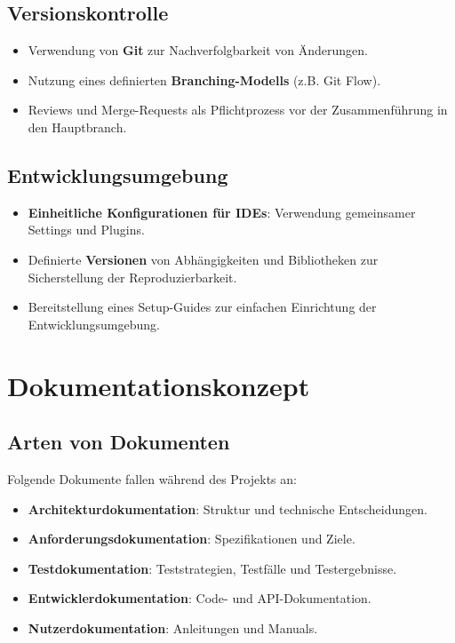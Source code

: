\documentclass[a4paper,12pt]{article}
\begin{document}
\subsection{Versionskontrolle}
\begin{itemize}
    \item Verwendung von \textbf{Git} zur Nachverfolgbarkeit von Änderungen.
    \item Nutzung eines definierten \textbf{Branching-Modells} (z.B. Git Flow).
    \item Reviews und Merge-Requests als Pflichtprozess vor der Zusammenführung in den Hauptbranch.
\end{itemize}

\subsection{Entwicklungsumgebung}
\begin{itemize}
    \item \textbf{Einheitliche Konfigurationen f\"ur IDEs}: Verwendung gemeinsamer Settings und Plugins.
    \item Definierte \textbf{Versionen} von Abhängigkeiten und Bibliotheken zur Sicherstellung der Reproduzierbarkeit.
    \item Bereitstellung eines Setup-Guides zur einfachen Einrichtung der Entwicklungsumgebung.
\end{itemize}
\newpage

\section{Dokumentationskonzept}
\subsection{Arten von Dokumenten}
Folgende Dokumente fallen w\"ahrend des Projekts an:
\begin{itemize}
    \item \textbf{Architekturdokumentation}: Struktur und technische Entscheidungen.
    \item \textbf{Anforderungsdokumentation}: Spezifikationen und Ziele.
    \item \textbf{Testdokumentation}: Teststrategien, Testfälle und Testergebnisse.
    \item \textbf{Entwicklerdokumentation}: Code- und API-Dokumentation.
    \item \textbf{Nutzerdokumentation}: Anleitungen und Manuals.
\end{itemize}
\end{document}
